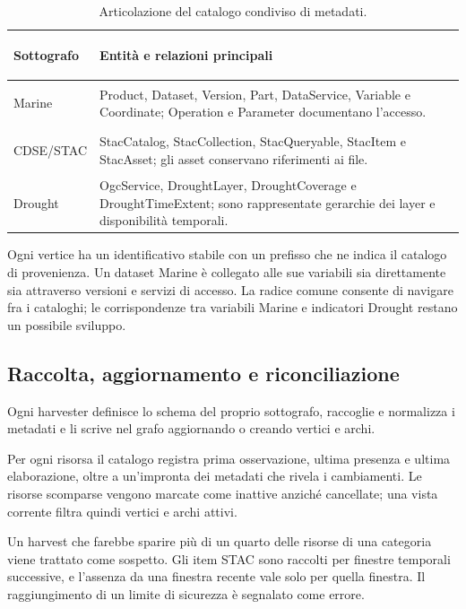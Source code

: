 \begin{table}[htbp]
\centering
\small
\begin{tabularx}{\textwidth}{>{\bfseries\raggedright\arraybackslash}p{}
    >{\raggedright\arraybackslash}X}
\toprule
Sottografo & Entità e relazioni principali \\
\midrule
Marine & Product, Dataset, Version, Part, DataService, Variable e Coordinate;
Operation e Parameter documentano l'accesso. \\
\addlinespace
CDSE/STAC & StacCatalog, StacCollection, StacQueryable, StacItem e StacAsset;
gli asset conservano riferimenti ai file. \\
\addlinespace
Drought & OgcService, DroughtLayer, DroughtCoverage e DroughtTimeExtent;
sono rappresentate gerarchie dei layer e disponibilità temporali. \\
\bottomrule
\end{tabularx}
\caption{Articolazione del catalogo condiviso di metadati.}
\label{tab:sottografi}
\end{table}

Ogni vertice ha un identificativo stabile con un prefisso che ne indica il
catalogo di provenienza. Un dataset Marine è collegato alle sue variabili sia
direttamente sia attraverso versioni e servizi di accesso. La radice comune
consente di navigare fra i cataloghi; le corrispondenze tra variabili Marine e
indicatori Drought restano un possibile sviluppo.

\subsection{Raccolta, aggiornamento e riconciliazione}

Ogni harvester definisce lo schema del proprio sottografo, raccoglie e
normalizza i metadati e li scrive nel grafo aggiornando o creando vertici e
archi.

Per ogni risorsa il catalogo registra prima osservazione, ultima presenza e
ultima elaborazione, oltre a un'impronta dei metadati che rivela i cambiamenti.
Le risorse scomparse vengono marcate come inattive anziché cancellate; una
vista corrente filtra quindi vertici e archi attivi.

Un harvest che farebbe sparire più di un quarto delle risorse di una categoria
viene trattato come sospetto. Gli item STAC sono raccolti per finestre
temporali successive, e l'assenza da una finestra recente vale solo per quella
finestra. Il raggiungimento di un limite di sicurezza è segnalato come errore.

